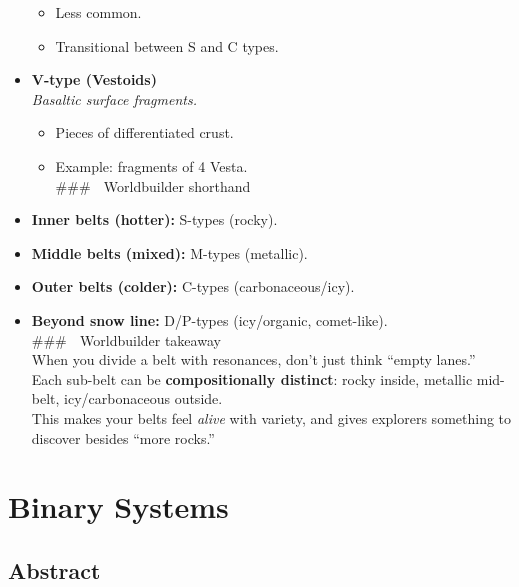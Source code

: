\documentclass[
  letterpaper,
]{book}
\providecommand{\tightlist}{%
  \setlength{\itemsep}{0pt}\setlength{\parskip}{0pt}}
\begin{document}
\begin{itemize}
  \begin{itemize}
  \tightlist
  \item
    Less common.\\
  \item
    Transitional between S and C types.
  \end{itemize}
\item
  \textbf{V-type (Vestoids)}\\
  \emph{Basaltic surface fragments.}

  \begin{itemize}
  \tightlist
  \item
    Pieces of differentiated crust.\\
  \item
    Example: fragments of 4 Vesta.\\
    \#\#\# 🔹 Worldbuilder shorthand
  \end{itemize}
\item
  \textbf{Inner belts (hotter):} S-types (rocky).\\
\item
  \textbf{Middle belts (mixed):} M-types (metallic).\\
\item
  \textbf{Outer belts (colder):} C-types (carbonaceous/icy).\\
\item
  \textbf{Beyond snow line:} D/P-types (icy/organic, comet-like).\\
  \#\#\# 📖 Worldbuilder takeaway\\
  When you divide a belt with resonances, don't just think ``empty
  lanes.''\\
  Each sub-belt can be \textbf{compositionally distinct}: rocky inside,
  metallic mid-belt, icy/carbonaceous outside.\\
  This makes your belts feel \emph{alive} with variety, and gives
  explorers something to discover besides ``more rocks.''
\end{itemize}

\part{Binary Systems}

\chapter{Abstract}\label{abstract-43}
\end{document}
